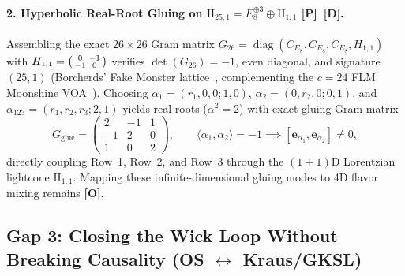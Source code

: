 \documentclass[11pt,a4paper]{article}
\newcommand{\badgeP}{\textbf{\color{sqJade}[P]}}
\newcommand{\badgeD}{\textbf{\color{sqRose}[D]}}
\newcommand{\badgeO}{\textbf{\color{sqAmber}[O]}}
\theoremstyle{definition}
\begin{document}
\paragraph{2. Hyperbolic Real-Root Gluing on $\mathrm{II}_{25,1} = E_8^{\oplus 3} \oplus \mathrm{II}_{1,1}$ \badgeP\ \badgeD.}
Assembling the exact $26\times 26$ Gram matrix $G_{26} = \operatorname{diag}(C_{E_8}, C_{E_8}, C_{E_8}, H_{1,1})$ with $H_{1,1} = \begin{psmallmatrix}0 & -1\\ -1 & 0\end{psmallmatrix}$ verifies $\det(G_{26}) = -1$, even diagonal, and signature $(25,1)$ (Borcherds' Fake Monster lattice~\cite{Borcherds1992}, complementing the $c=24$ FLM Moonshine VOA~\cite{FLM1988}). Choosing $\alpha_1 = (r_1,0,0;1,0)$, $\alpha_2 = (0,r_2,0;0,1)$, and $\alpha_{123} = (r_1,r_2,r_3;2,1)$ yields real roots ($\alpha^2 = 2$) with exact gluing Gram matrix
\begin{equation}
  G_{\mathrm{glue}} = \begin{pmatrix} 2 & -1 & 1 \\ -1 & 2 & 0 \\ 1 & 0 & 2 \end{pmatrix},
  \qquad \langle \alpha_1, \alpha_2 \rangle = -1 \implies [\mathbf{e}_{\alpha_1}, \mathbf{e}_{\alpha_2}] \neq 0,
\end{equation}
directly coupling Row~1, Row~2, and Row~3 through the $(1+1)$D Lorentzian lightcone $\mathrm{II}_{1,1}$. Mapping these infinite-dimensional gluing modes to 4D flavor mixing remains \badgeO.

\subsection{Gap 3: Closing the Wick Loop Without Breaking Causality (OS $\leftrightarrow$ Kraus/GKSL)}
\end{document}
